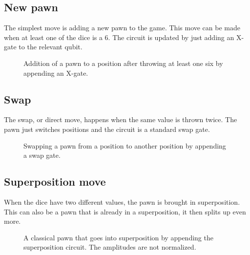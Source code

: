\documentclass[final,5p,times,twocolumn,authoryear]{elsarticle}
\begin{document}
\subsection{New pawn}
The simplest move is adding a new pawn to the game. This move can be made when at least one of the dice is a 6. The circuit is updated by just adding an X-gate to the relevant qubit.
\begin{figure}[H]
    \centering
    
    \vspace{-1.7cm}
    \caption{Addition of a pawn to a position after throwing at least one six by appending an X-gate.}
    \label{fig:new_pawn}
\end{figure}

\subsection{Swap}
The swap, or direct move, happens when the same value is thrown twice. The pawn just switches positions and the circuit is a standard swap gate.
\begin{figure}[H]
    \centering
    
    \vspace{-1.7cm}
    \caption{Swapping a pawn from a position to another position by appending a swap gate.}
    \label{fig:direct_move}
\end{figure}

\subsection{Superposition move}
When the dice have two different values, the pawn is brought in superposition. This can also be a pawn that is already in a superposition, it then splits up even more.
\begin{figure}[H]
    \centering
    
    \vspace{-1.7cm}
    \caption{A classical pawn that goes into superposition by appending the superposition circuit. The amplitudes are not normalized.}
    \label{fig:superposition_move}
\end{figure}
\end{document}
